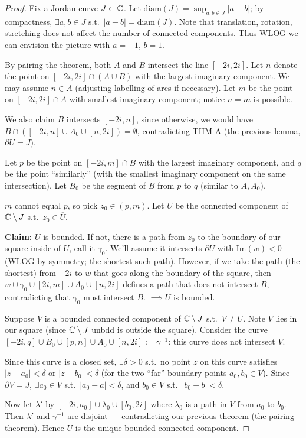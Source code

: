 \documentclass[11pt]{article}
\begin{document}
\begin{proof}
Fix a Jordan curve $J\subset{\mathbb{C}}$. Let $\mathrm{diam}(J) = \sup_{a,b\in J} |a-b|$; by compactness, $\exists a,b\in J$ s.t.\ $|a-b| = \mathrm{diam}(J)$. Note that translation, rotation, stretching does not affect the number of connected components. Thus WLOG we can envision the picture with $a=-1$, $b=1$.

By pairing the theorem, both $A$ and $B$ intersect the line $[-2i,2i]$. Let $n$ denote the point on $[-2i,2i]\cap(A\cup B)$ with the largest imaginary component. We may assume $n\in A$ (adjusting labelling of arcs if necessary). Let $m$ be the point on $[-2i,2i]\cap A$ with smallest imaginary component; notice $n=m$ is possible.

We also claim $B$ intersects $[-2i,n]$, since otherwise, we would have $B\cap([-2i,n]\cup A_0\cup[n,2i]) = \emptyset$, contradicting THM A (the previous lemma, $\partial U = J$).

Let $p$ be the point on $[-2i,m]\cap B$ with the largest imaginary component, and $q$ be the point ``similarly'' (with the smallest imaginary component on the same intersection). Let $B_0$ be the segment of $B$ from $p$ to $q$ (similar to $A,A_0$).

$m$ cannot equal $p$, so pick $z_0\in(p,m)$. Let $U$ be the connected component of ${\mathbb{C}}\setminus J$ s.t.\ $z_0\in\overline U$.

\textbf{Claim:} $U$ is bounded. If not, there is a path from $z_0$ to the boundary of our square inside of $U$, call it $\gamma_0$. We'll assume it intersects $\partial U$ with $\mathrm{Im}(w)<0$ (WLOG by symmetry; the shortest such path). However, if we take the path (the shortest) from $-2i$ to $w$ that goes along the boundary of the square, then $w\cup\gamma_0\cup[2i,m]\cup A_0\cup[n,2i]$ defines a path that does not intersect $B$, contradicting that $\gamma_0$ must intersect $B$. $\implies U$ is bounded.

Suppose $V$ is a bounded connected component of ${\mathbb{C}}\setminus J$ s.t.\ $V\ne U$. Note $V$ lies in our square (since ${\mathbb{C}}\setminus J$ unbdd is outside the square). Consider the curve $[-2i,q]\cup B_0\cup[p,n]\cup A_0\cup[n,2i] := \gamma^{-1}$: this curve does not intersect $V$.

Since this curve is a closed set, $\exists \delta>0$ s.t.\ no point $z$ on this curve satisfies $|z-a_0|<\delta$ or $|z-b_0|<\delta$ (for the two ``far'' boundary points $a_0,b_0\in V$). Since $\partial V = J$, $\exists a_0\in V$ s.t.\ $|a_0-a|<\delta$, and $b_0\in V$ s.t.\ $|b_0-b|<\delta$.

Now let $\lambda'$ by $[-2i,a_0]\cup\lambda_0\cup[b_0,2i]$ where $\lambda_0$ is a path in $V$ from $a_0$ to $b_0$. Then $\lambda'$ and $\gamma^{-1}$ are disjoint --- contradicting our previous theorem (the pairing theorem). Hence $U$ is the unique bounded connected component.
\end{proof}
\end{document}
